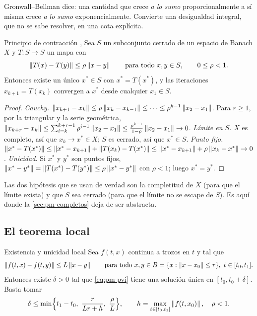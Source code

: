 \begin{ideaclave}
Gronwall--Bellman dice: una cantidad que crece \emph{a lo sumo} proporcionalmente a sí misma crece \emph{a lo sumo} exponencialmente. Convierte una desigualdad integral, que no se sabe resolver, en una cota explícita.
\end{ideaclave}

\begin{teorema}[label=thm:pm-contraccion]{Principio de contracción \citep{Ban22}, \citep[Teorema~B.1]{Kha02}}
Sea $S$ un subconjunto cerrado de un espacio de Banach $X$ y $T:S\to S$ un mapa con
\[
  \left\lVert T(x)-T(y)\right\rVert\le\rho\left\lVert x-y\right\rVert\qquad\text{para todo }x,y\in S,\qquad 0\le\rho<1 .
\]
Entonces existe un único $x^*\in S$ con $x^*=T(x^*)$, y las iteraciones $x_{k+1}=T(x_k)$ convergen a $x^*$ desde cualquier $x_1\in S$.
\end{teorema}

\begin{proof}
\emph{Cauchy.} $\left\lVert x_{k+1}-x_k\right\rVert\le\rho\left\lVert x_k-x_{k-1}\right\rVert\le\dots\le\rho^{k-1}\left\lVert x_2-x_1\right\rVert$. Para $r\ge1$, por la triangular y la serie geométrica,
$\left\lVert x_{k+r}-x_k\right\rVert\le\sum_{i=k}^{k+r-1}\rho^{i-1}\left\lVert x_2-x_1\right\rVert\le\frac{\rho^{k-1}}{1-\rho}\left\lVert x_2-x_1\right\rVert\to0$.
\emph{Límite en $S$.} $X$ es completo, así que $x_k\to x^*\in X$; $S$ es cerrado, así que $x^*\in S$.
\emph{Punto fijo.} $\left\lVert x^*-T(x^*)\right\rVert\le\left\lVert x^*-x_{k+1}\right\rVert+\left\lVert T(x_k)-T(x^*)\right\rVert\le\left\lVert x^*-x_{k+1}\right\rVert+\rho\left\lVert x_k-x^*\right\rVert\to0$.
\emph{Unicidad.} Si $x^*$ y $y^*$ son puntos fijos, $\left\lVert x^*-y^*\right\rVert=\left\lVert T(x^*)-T(y^*)\right\rVert\le\rho\left\lVert x^*-y^*\right\rVert$ con $\rho<1$; luego $x^*=y^*$.
\end{proof}

Las dos hipótesis que se usan de verdad son la completitud de $X$ (para que el límite exista) y que $S$ sea cerrado (para que el límite no se escape de $S$). Es aquí donde la \cref{sec:pm-completos} deja de ser abstracta.

\subsection{El teorema local}

\begin{teorema}[label=thm:pm-local]{Existencia y unicidad local \citep[Teorema~3.1]{Kha02}}
Sea $f(t,x)$ continua a trozos en $t$ y tal que
\[
  \norm{f(t,x)-f(t,y)}\le L\norm{x-y}\qquad\text{para todo }x,y\in B=\{x:\norm{x-x_0}\le r\},\ t\in[t_0,t_1] .
\]
Entonces existe $\delta>0$ tal que \eqref{eq:pm-pvi} tiene una solución única en $[t_0,t_0+\delta]$. Basta tomar
\begin{equation}
  \delta\le\min\Bigl\{t_1-t_0,\ \frac{r}{Lr+h},\ \frac\rho L\Bigr\},\qquad h=\max_{t\in[t_0,t_1]}\norm{f(t,x_0)},\quad \rho<1 .
  \label{eq:pm-delta}
\end{equation}
\end{teorema}

